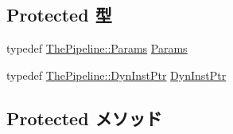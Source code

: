 \subsection*{Protected 型}
\begin{DoxyCompactItemize}
\item 
typedef \hyperlink{namespaceThePipeline_ab62ca16eeca26566ad2422b5df4943ce}{ThePipeline::Params} \hyperlink{classPipelineStage_aa14874985381292db0aea05d1c8a122c}{Params}
\item 
typedef \hyperlink{classRefCountingPtr}{ThePipeline::DynInstPtr} \hyperlink{classPipelineStage_af9d0c8a46736ba6aa2d8bb94da1a5e73}{DynInstPtr}
\end{DoxyCompactItemize}
\subsection*{Protected メソッド}
